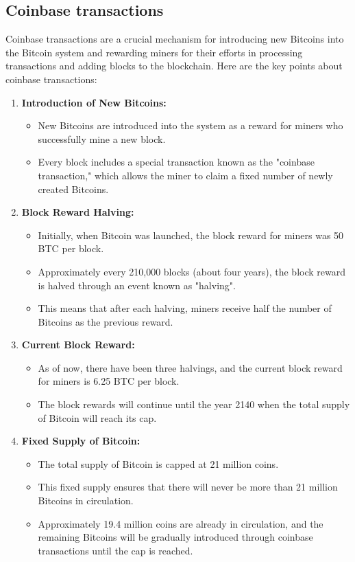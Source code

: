 \subsection{Coinbase transactions}
Coinbase transactions are a crucial mechanism for introducing new Bitcoins into the Bitcoin system and rewarding miners for their efforts in processing transactions and adding blocks to the blockchain. Here are the key points about coinbase transactions:
\begin{enumerate}
	\item \textbf{Introduction of New Bitcoins:}
	\begin{itemize}
		\item New Bitcoins are introduced into the system as a reward for miners who successfully mine a new block.
		\item Every block includes a special transaction known as the "coinbase transaction," which allows the miner to claim a fixed number of newly created Bitcoins.
	\end{itemize}
	\item \textbf{Block Reward Halving:}
	\begin{itemize}
		\item Initially, when Bitcoin was launched, the block reward for miners was 50 BTC per block.
		\item Approximately every 210,000 blocks (about four years), the block reward is halved through an event known as "halving".
		\item This means that after each halving, miners receive half the number of Bitcoins as the previous reward.
	\end{itemize}
	\item \textbf{Current Block Reward:}
	\begin{itemize}
		\item As of now, there have been three halvings, and the current block reward for miners is 6.25 BTC per block.
		\item The block rewards will continue until the year 2140 when the total supply of Bitcoin will reach its cap.
	\end{itemize}
	\item \textbf{Fixed Supply of Bitcoin:}
	\begin{itemize}
		\item The total supply of Bitcoin is capped at 21 million coins.
		\item This fixed supply ensures that there will never be more than 21 million Bitcoins in circulation.
		\item Approximately 19.4 million coins are already in circulation, and the remaining Bitcoins will be gradually introduced through coinbase transactions until the cap is reached.

\end{itemize}
\end{enumerate}
